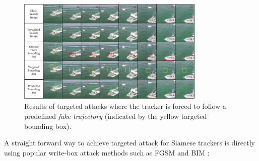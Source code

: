 \documentclass[journal]{IEEEtran}
\begin{document}
\begin{figure}[t]
  \centering
  \includegraphics[width=0.8\textwidth]{images_imperceptible/vis_v6.pdf}
  \caption{Results of targeted attacks where the tracker is forced to follow a predefined \textit{fake trajectory} (indicated by the yellow targeted bounding box).}
  \label{fig:vis}
\end{figure}

A straight forward way to achieve targeted attack for Siamese trackers is directly using popular write-box attack methods such as FGSM \cite{FGSM} and BIM \cite{DBLP:conf/iclr/KurakinGB17a}:
\end{document}
